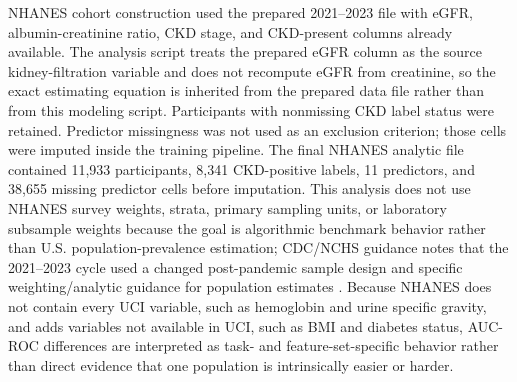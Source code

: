 \documentclass[12pt]{article}
\begin{document}
\begin{table}[H]
\centering
\caption{Dataset audit from the regenerated pipeline. Predictor missingness is counted before train-only imputation.}
\small
\renewcommand{\arraystretch}{1.18}
\setlength{\tabcolsep}{6pt}
\end{table}

NHANES cohort construction used the prepared 2021--2023 file with eGFR, albumin-creatinine ratio, CKD stage, and CKD-present columns already available. The analysis script treats the prepared eGFR column as the source kidney-filtration variable and does not recompute eGFR from creatinine, so the exact estimating equation is inherited from the prepared data file rather than from this modeling script. Participants with nonmissing CKD label status were retained. Predictor missingness was not used as an exclusion criterion; those cells were imputed inside the training pipeline. The final NHANES analytic file contained 11,933 participants, 8,341 CKD-positive labels, 11 predictors, and 38,655 missing predictor cells before imputation. This analysis does not use NHANES survey weights, strata, primary sampling units, or laboratory subsample weights because the goal is algorithmic benchmark behavior rather than U.S. population-prevalence estimation; CDC/NCHS guidance notes that the 2021--2023 cycle used a changed post-pandemic sample design and specific weighting/analytic guidance for population estimates \cite{nhanes2024brief}. Because NHANES does not contain every UCI variable, such as hemoglobin and urine specific gravity, and adds variables not available in UCI, such as BMI and diabetes status, AUC-ROC differences are interpreted as task- and feature-set-specific behavior rather than direct evidence that one population is intrinsically easier or harder.
\end{document}
